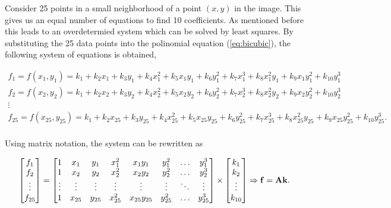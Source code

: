 \documentclass{ipol}
\numberwithin{equation}{section}
\numberwithin{table}{section}
\numberwithin{figure}{section}
\begin{document}
Consider 25 points in a small neighborhood of a point $(x,y)$ in the image. This gives us an equal number of equations 
to find 10 coefficients. As mentioned before this leads to an overdetermied system which can be solved by least squares. 
By substituting the 25 data points into the polinomial equation (\ref{eq:bicubic}), the following system of 
equations is obtained,

\begin{equation*}
	\begin{array}{l}
		f_1 = f(x_1,y_1) = k_1 + k_2x_1 + k_3y_1 + k_4x_1^2 + k_5x_1y_1 + k_6y_1^2 + k_7x_1^3 + k_8x_1^2y_1 + k_9x_1y_1^2 + k_{10}y_1^3 \\
		f_2 = f(x_2,y_2) = k_1 + k_2x_2 + k_3y_2 + k_4x_2^2 + k_5x_2y_2 + k_6y_2^2 + k_7x_2^3 + k_8x_2^2y_2 + k_9x_2y_2^2 + k_{10}y_2^3 \\
		\vdots \\
		f_{25} = f(x_{25},y_{25}) = k_1 + k_2x_{25} + k_3y_{25} + k_4x_{25}^2 + k_5x_{25}y_{25} + k_6y_{25}^2 + k_7x_{25}^3 + k_8x_{25}^2y_{25} + k_9x_{25}y_{25}^2 + k_{10}y_{25}^3 . \\
	\end{array}
\end{equation*}

Using matrix notation, the system can be rewritten as

\begin{equation*}
	\begin{bmatrix} 
		f_1		\\ 
		f_2		\\ 
		\vdots	\\
		f_{25}
	\end{bmatrix} 
	= 
	\begin{bmatrix} 
		1 		& x_1 		& y_1 		& x_1^2 	& x_1y_1 		& y_1^2 	& \hdots 	& y_1^3 	\\
		1 		& x_2 		& y_2 		& x_2^2 	& x_2y_2 		& y_2^2 	& \hdots 	& y_2^3 	\\
		\vdots	& \vdots	& \vdots	& \vdots	& \vdots		& \vdots	& \ddots	& \vdots	\\
		1 		& x_{25}	& y_{25}	& x_{25}^2 	& x_{25}y_{25} 	& y_{25}^2 	& \hdots 	& y_{25}^3
	\end{bmatrix}
	\times
	\begin{bmatrix}
		k_1		\\
		k_2		\\
		\vdots	\\
		k_{10}
	\end{bmatrix}
	\Rightarrow \mathbf{f} = \mathbf{A}\mathbf{k} .\\
\end{equation*}
\end{document}
